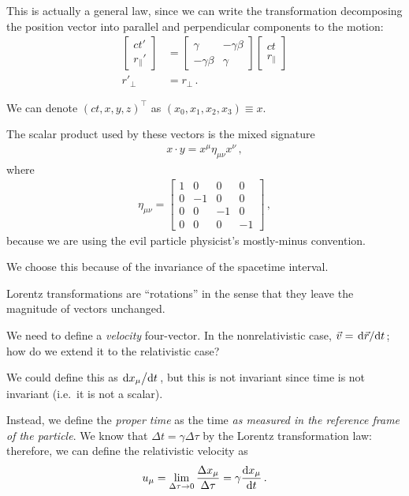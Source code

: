 \documentclass[main.tex]{subfiles}
\begin{document}
This is actually a general law, since we can write the transformation decomposing the position vector into parallel and perpendicular components to the motion: 
%
\begin{align}
\left[\begin{array}{c}
ct' \\ 
r_{\parallel}'
\end{array}\right]
&=
\left[\begin{array}{cc}
\gamma  & -\gamma \beta  \\ 
-\gamma \beta  & \gamma 
\end{array}\right]
\left[\begin{array}{c}
ct \\ 
r_{\parallel}
\end{array}\right]  \\
r'_{\perp} &= r_{\perp}
\,.
\end{align}

We can denote \((ct, x, y, z)^{\top}\) as \((x_0, x_1, x_2, x_3 ) \equiv x\). 

The scalar product used by these vectors is the mixed signature 
%
\begin{align}
x \cdot y = x^{\mu } \eta_{\mu \nu } x^{\nu }
\,,
\end{align}
%
where
%
\begin{align}
\eta_{\mu \nu } = \left[\begin{array}{cccc}
1 & 0 & 0 & 0 \\ 
0 & -1 & 0 & 0 \\ 
0 & 0 & -1 & 0 \\ 
0 & 0 & 0 & -1
\end{array}\right]
\,,
\end{align}
%
because we are using the evil particle physicist's mostly-minus convention.

We choose this because of the invariance of the spacetime interval. 

Lorentz transformations are ``rotations'' in the sense that they leave the magnitude of vectors unchanged. 

We need to define a \emph{velocity} four-vector.
In the nonrelativistic case, \(\vec{v} = \dv*{\vec{r}}{t}\); how do we extend it to the relativistic case?

We could define this as \(\dv*{x_{\mu }}{t}\), but this is not invariant since time is not invariant (i.e.\ it is not a scalar).

Instead, we define the \emph{proper time} as the time \emph{as measured in the reference frame of the particle}. 
We know that \(\Delta t = \gamma \Delta \tau \) by the Lorentz transformation law: therefore, we can define the relativistic velocity as
%
\begin{align}
u_{\mu } = \lim_{ \Delta \tau \to 0} \frac{ \Delta x_{\mu }}{\Delta \tau } = \gamma \dv{x_{\mu }}{t}
\,.
\end{align}
\end{document}
